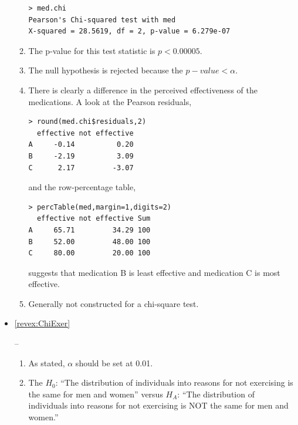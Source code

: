 \documentclass[10pt,openany]{book}\usepackage[]{graphicx}\usepackage[]{color}
\makeatletter
\newenvironment{kframe}{%
 \def\at@end@of@kframe{}%
 \ifinner\ifhmode%
  \def\at@end@of@kframe{\end{minipage}}%
  \begin{minipage}{\columnwidth}%
 \fi\fi%
 \def\FrameCommand##1{\hskip\@totalleftmargin \hskip-\fboxsep
 \colorbox{shadecolor}{##1}\hskip-\fboxsep
     \hskip-\linewidth \hskip-\@totalleftmargin \hskip\columnwidth}%
 \MakeFramed {\advance\hsize-\width
   \@totalleftmargin\z@ \linewidth\hsize
   \@setminipage}}%
 {\par\unskip\endMakeFramed%
 \at@end@of@kframe}
\newenvironment{knitrout}{}{} %
\makeatother
\begin{document}
\begin{itemize}
\begin{enumerate}
\begin{knitrout}
\color{fgcolor}\begin{kframe}
\begin{verbatim}
> med.chi
Pearson's Chi-squared test with med 
X-squared = 28.5619, df = 2, p-value = 6.279e-07
\end{verbatim}
\end{kframe}
\end{knitrout}
      \item The p-value for this test statistic is $p<0.00005$.
      \item The null hypothesis is rejected because the $p-value<\alpha$.
      \item There is clearly a difference in the perceived effectiveness of the medications.  A look at the Pearson residuals,
\begin{knitrout}
\color{fgcolor}\begin{kframe}
\begin{verbatim}
> round(med.chi$residuals,2)
  effective not effective
A     -0.14          0.20
B     -2.19          3.09
C      2.17         -3.07
\end{verbatim}
\end{kframe}
\end{knitrout}
and the row-percentage table,
\begin{knitrout}
\color{fgcolor}\begin{kframe}
\begin{verbatim}
> percTable(med,margin=1,digits=2)
  effective not effective Sum
A     65.71         34.29 100
B     52.00         48.00 100
C     80.00         20.00 100
\end{verbatim}
\end{kframe}
\end{knitrout}
suggests that medication B is least effective and medication C is most effective.
      \item Generally not constructed for a chi-square test.
    \end{enumerate}
  \item \hypertarget{ans:ChiExer}{\ref{revex:ChiExer}} --
    \begin{enumerate}
      \item As stated, $\alpha$ should be set at 0.01.
      \item The $H_{0}$: ``The distribution of individuals into reasons for not exercising is the same for men and women'' versus $H_{A}$: ``The distribution of individuals into reasons for not exercising is NOT the same for men and women.''

\end{enumerate}
\end{itemize}
\end{document}
